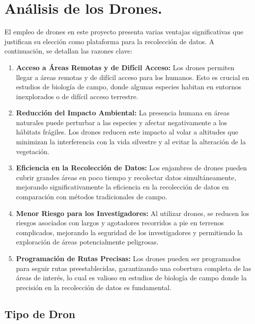 \section{Análisis de los Drones.}
El empleo de drones en este proyecto presenta varias ventajas significativas que justifican su elección como plataforma para la recolección de datos. A continuación, se detallan las razones clave:
\begin{enumerate}
  \item \textbf{Acceso a Áreas Remotas y de Difícil Acceso:} Los drones permiten llegar a áreas remotas y de difícil acceso para los humanos. Esto es crucial en estudios de biología de campo, donde algunas especies habitan en entornos inexplorados o de difícil acceso terrestre.
  \item \textbf{Reducción del Impacto Ambiental:} La presencia humana en áreas naturales puede perturbar a las especies y afectar negativamente a los hábitats frágiles. Los drones reducen este impacto al volar a altitudes que minimizan la interferencia con la vida silvestre y al evitar la alteración de la vegetación.
  \item \textbf{Eficiencia en la Recolección de Datos:} Los enjambres de drones pueden cubrir grandes áreas en poco tiempo y recolectar datos simultáneamente, mejorando significativamente la eficiencia en la recolección de datos en comparación con métodos tradicionales de campo.
  \item \textbf{Menor Riesgo para los Investigadores:} Al utilizar drones, se reducen los riesgos asociados con largos y agotadores recorridos a pie en terrenos complicados, mejorando la seguridad de los investigadores y permitiendo la exploración de áreas potencialmente peligrosas.
  \item \textbf{Programación de Rutas Precisas:} Los drones pueden ser programados para seguir rutas preestablecidas, garantizando una cobertura completa de las áreas de interés, lo cual es valioso en estudios de biología de campo donde la precisión en la recolección de datos es fundamental.
\end{enumerate}

\subsection{Tipo de Dron}

